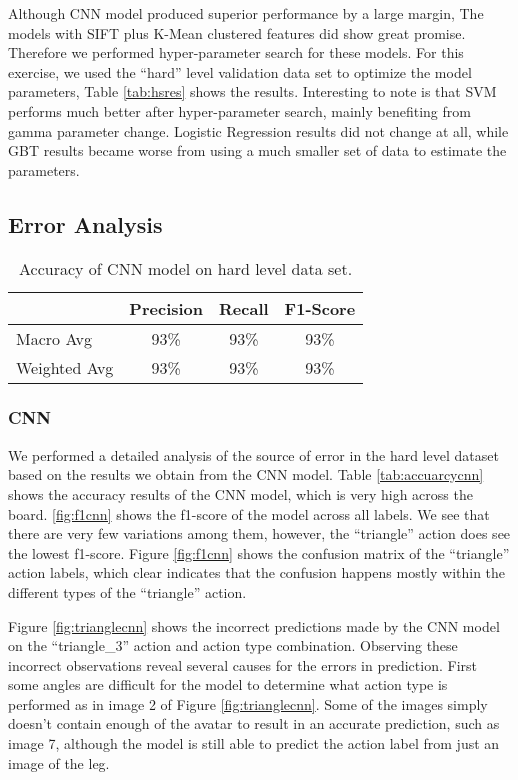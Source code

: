 \documentclass[
	a4paper, %
	10pt, %
	unnumberedsections, %
	twoside, %
]{t0004}
\begin{document}
Although CNN model produced superior performance by a large margin, The models with SIFT plus K-Mean clustered features did show great promise. Therefore we performed hyper-parameter search for these models. For this exercise, we used the ``hard'' level validation data set to optimize the model parameters, Table \ref{tab:hsres} shows the results. Interesting to note is that SVM performs much better after hyper-parameter search, mainly benefiting from gamma parameter change. Logistic Regression results did not change at all, while GBT results became worse from using a much smaller set of data to estimate the parameters.

\subsection{Error Analysis}

\begin{table} %
	\caption{Accuracy of CNN model on hard level data set.}
	\centering
	\begin{tabular}{lccc}
		\toprule
		                  & Precision & Recall & F1-Score \\
		\midrule
		Macro Avg & 93\% & 93\% & 93\% \\
		Weighted Avg & 93\% & 93\% & 93\% \\
		\bottomrule
	\end{tabular}
	\label{tab:accuracycnn}
\end{table}

\subsubsection{CNN} We performed a detailed analysis of the source of error in the hard level dataset based on the results we obtain from the CNN model. Table \ref{tab:accuarcycnn} shows the accuracy results of the CNN model, which is very high across the board. \ref{fig:f1cnn} shows the f1-score of the model across all labels. We see that there are very few variations among them, however, the ``triangle'' action does see the lowest f1-score. Figure \ref{fig:f1cnn} shows the confusion matrix of the ``triangle'' action labels, which clear indicates that the confusion happens mostly within the different types of the ``triangle'' action.

Figure \ref{fig:trianglecnn} shows the incorrect predictions made by the CNN model on the ``triangle\_3'' action and action type combination. Observing these incorrect observations reveal several causes for the errors in prediction. First some angles are difficult for the model to determine what action type is performed as in image 2 of Figure \ref{fig:trianglecnn}. Some of the images simply doesn't contain enough of the avatar to result in an accurate prediction, such as image 7, although the model is still able to predict the action label from just an image of the leg.
\end{document}
